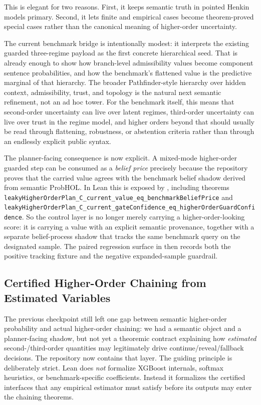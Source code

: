 \documentclass[11pt,openany]{report}
\begin{document}
This is elegant for two reasons.  First, it keeps semantic truth in pointed
Henkin models primary.  Second, it lets finite and empirical cases become
theorem-proved special cases rather than the canonical meaning of
higher-order uncertainty.

The current benchmark bridge is intentionally modest: it interprets the
existing guarded three-regime payload as the first concrete hierarchical seed.
That is already enough to show how branch-level admissibility values become
component sentence probabilities, and how the benchmark's flattened value is the
predictive marginal of that hierarchy.  The broader Pathfinder-style hierarchy
over hidden context, admissibility, trust, and topology is the natural next
semantic refinement, not an ad hoc tower.  For the benchmark itself, this means
that second-order uncertainty can live over latent regimes, third-order
uncertainty can live over trust in the regime model, and higher orders beyond
that should usually be read through flattening, robustness, or abstention
criteria rather than through an endlessly explicit public syntax.

The planner-facing consequence is now explicit.  A mixed-mode higher-order
guarded step can be consumed as a \emph{belief price} precisely because the
repository proves that the carried value agrees with the benchmark belief
shadow derived from semantic ProbHOL.  In Lean this is exposed by
, including theorems
\texttt{leakyHigherOrderPlan\_C\_current\_value\_eq\_benchmarkBeliefPrice} and
\texttt{leakyHigherOrderPlan\_C\_current\_gateConfidence\_eq\_higherOrderGuardConfidence}.
So the control layer is no longer merely carrying a higher-order-looking score:
it is carrying a value with an explicit semantic provenance, together with a
separate belief-process shadow that tracks the same benchmark query on the
designated sample.  The paired regression surface in
 then records
both the positive tracking fixture and the negative expanded-sample guardrail.

\subsection{Certified Higher-Order Chaining from Estimated Variables}

The previous checkpoint still left one gap between semantic higher-order
probability and actual higher-order chaining: we had a semantic object and a
planner-facing shadow, but not yet a theoremic contract explaining how
\emph{estimated} second-/third-order quantities may legitimately drive
continue/reveal/fallback decisions.  The repository now contains that layer.
The guiding principle is deliberately strict.  Lean does \emph{not} formalize
XGBoost internals, softmax heuristics, or benchmark-specific coefficients.
Instead it formalizes the certified interfaces that any empirical estimator
must satisfy before its outputs may enter the chaining theorems.
\end{document}
